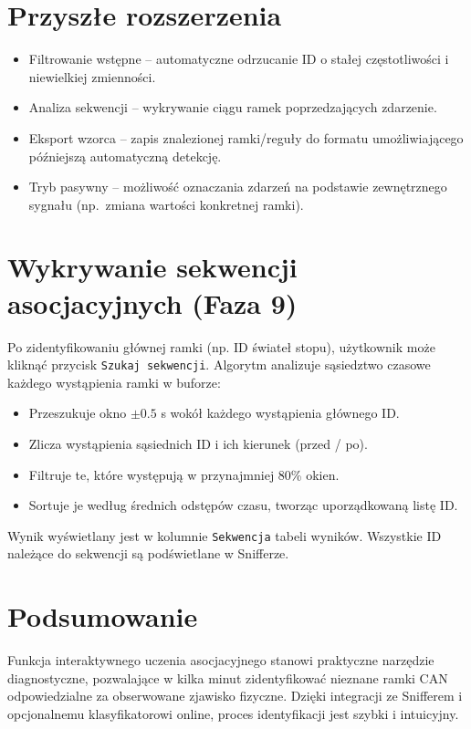 \documentclass[a4paper,12pt]{article}
\begin{document}
\section{Przyszłe rozszerzenia}
\begin{itemize}[noitemsep]
    \item Filtrowanie wstępne – automatyczne odrzucanie ID o stałej częstotliwości i niewielkiej zmienności.
    \item Analiza sekwencji – wykrywanie ciągu ramek poprzedzających zdarzenie.
    \item Eksport wzorca – zapis znalezionej ramki/reguły do formatu umożliwiającego późniejszą automatyczną detekcję.
    \item Tryb pasywny – możliwość oznaczania zdarzeń na podstawie zewnętrznego sygnału (np.\ zmiana wartości konkretnej ramki).
\end{itemize}


\section{Wykrywanie sekwencji asocjacyjnych (Faza 9)}
Po zidentyfikowaniu głównej ramki (np. ID świateł stopu), użytkownik może kliknąć przycisk \texttt{Szukaj sekwencji}. Algorytm analizuje sąsiedztwo czasowe każdego wystąpienia ramki w buforze:

\begin{itemize}[noitemsep]
    \item Przeszukuje okno $\pm 0.5$ s wokół każdego wystąpienia głównego ID.
    \item Zlicza wystąpienia sąsiednich ID i ich kierunek (przed / po).
    \item Filtruje te, które występują w przynajmniej 80\% okien.
    \item Sortuje je według średnich odstępów czasu, tworząc uporządkowaną listę ID.
\end{itemize}

Wynik wyświetlany jest w kolumnie \texttt{Sekwencja} tabeli wyników. Wszystkie ID należące do sekwencji są podświetlane w Snifferze.

\section{Podsumowanie}
Funkcja interaktywnego uczenia asocjacyjnego stanowi praktyczne narzędzie diagnostyczne, pozwalające w kilka minut zidentyfikować nieznane ramki CAN odpowiedzialne za obserwowane zjawisko fizyczne. Dzięki integracji ze Snifferem i opcjonalnemu klasyfikatorowi online, proces identyfikacji jest szybki i intuicyjny.
\end{document}
